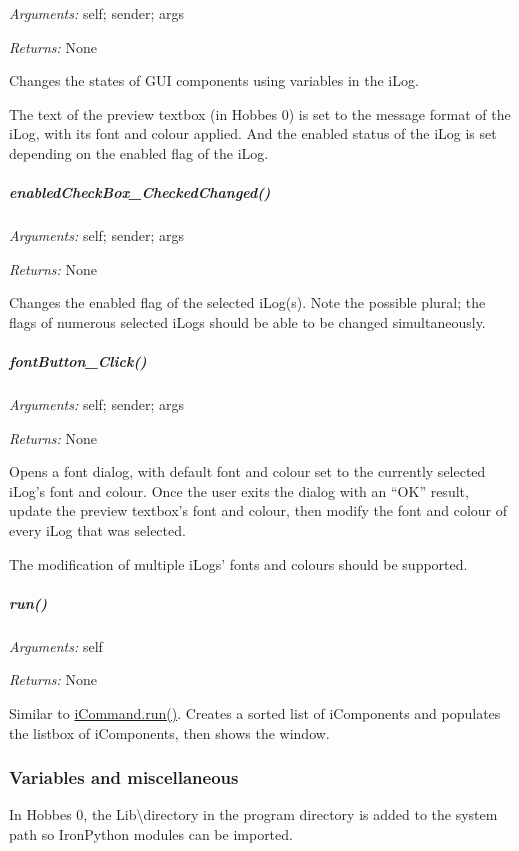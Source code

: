 \documentclass[12pt,letterpaper]{article}
\begin{document}
\emph{Arguments:} self; sender; args

\emph{Returns:} None

Changes the states of GUI components using variables in the iLog.

The text of the preview textbox (in Hobbes 0) is set to the message format of the iLog, with its font and colour applied. And the enabled status of the iLog is set depending on the enabled flag of the iLog.



%
%
\subparagraph{enabledCheckBox\_CheckedChanged()}
\label{4.6.1.6.4}

\emph{Arguments:} self; sender; args

\emph{Returns:} None

Changes the enabled flag of the selected iLog(s). Note the possible plural; the flags of numerous selected iLogs should be able to be changed simultaneously.



%
%
\subparagraph{fontButton\_Click()}
\label{4.6.1.6.5}

\emph{Arguments:} self; sender; args

\emph{Returns:} None

Opens a font dialog, with default font and colour set to the currently selected iLog's font and colour. Once the user exits the dialog with an ``OK'' result, update the preview textbox's font and colour, then modify the font and colour of every iLog that was selected.

The modification of multiple iLogs' fonts and colours should be supported.



%
%
\subparagraph{run()}
\label{4.6.1.6.6}

\emph{Arguments:} self

\emph{Returns:} None

Similar to \hyperref[4.5.1.1.11]{iCommand.run()}. Creates a sorted list of iComponents and populates the listbox of iComponents, then shows the window.



%
%
\subsubsection{Variables and miscellaneous}
\label{4.6.2}

In Hobbes 0, the Lib\textbackslash directory in the program directory is added to the system path so IronPython modules can be imported.
\end{document}

